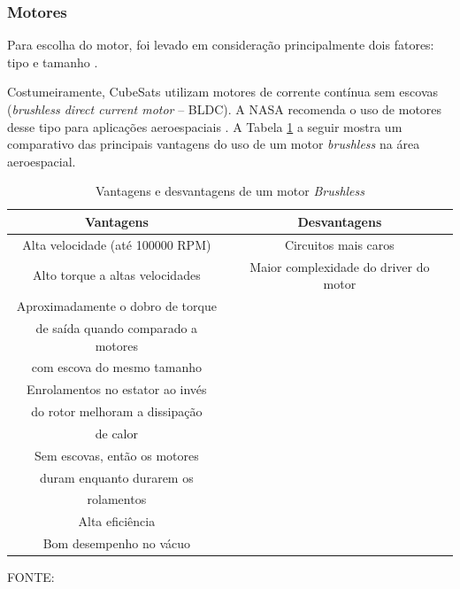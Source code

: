 \documentclass[
	12pt,				%
	openany,			%
	twoside,			%
	a4paper,			%
	english,			%
	french,				%
	spanish,			%
	brazil,				%
	oldfontcommands
	]{abntex2}
\begin{document}

\subsubsection{Motores}

Para escolha do motor, foi levado em consideração principalmente dois fatores: tipo e tamanho \cite{Ericksson}.

Costumeiramente, CubeSats utilizam motores de corrente contínua sem escovas (\textit{brushless direct current motor} – BLDC). A NASA recomenda o uso de motores desse tipo para aplicações aeroespaciais \cite{NASABLDC}. A Tabela \ref{tab:VnteDesv} a seguir mostra um comparativo das principais vantagens do uso de um motor \textit{brushless} na área aeroespacial.

\begin{table}[h]
	\caption{Vantagens e desvantagens de um motor \textit{Brushless}}
		\centering
	\begin{tabular}{|c|c|}
		\hline
		\textbf{Vantagens} & \textbf{Desvantagens} \\ 
		\hline 
		Alta velocidade (até 100000 RPM) & Circuitos mais caros \\ 
		\hline 
		Alto torque a altas velocidades & Maior complexidade do driver do motor \\ 
		\hline 
		Aproximadamente o dobro de torque & \\
		 de saída quando comparado a motores & \\
		  com escova do mesmo tamanho &  \\ 
		\hline 
		Enrolamentos no estator ao invés & \\
		 do rotor melhoram a dissipação & \\
		  de calor & \\ 
		\hline 
		Sem escovas, então os motores & \\
		 duram enquanto durarem os & \\
		  rolamentos & \\ 
		\hline 
		Alta eficiência & \\ 
		\hline 
		Bom desempenho no vácuo & \\ 
		\hline
	\end{tabular}
	
	\begin{small}
	\vspace{3pt}	
	FONTE: \cite{Ericksson}
	\end{small}
	\label{tab:VnteDesv}
\end{table}
\end{document}
